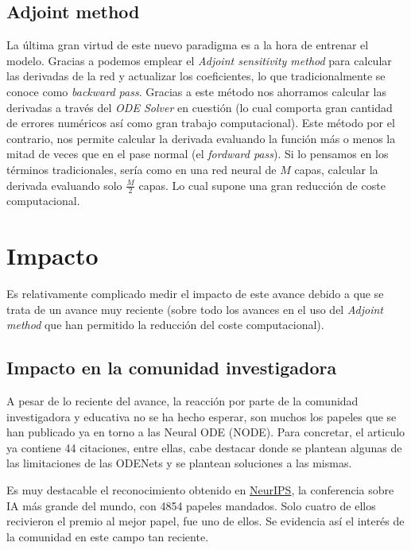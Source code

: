 \documentclass[12pt]{report}
\begin{document}
\section{Adjoint method}
La última gran virtud de este nuevo paradigma es a la hora de entrenar el
modelo. Gracias a \cite{node} podemos emplear el \textit{Adjoint sensitivity
method} para calcular las derivadas de la red y actualizar los coeficientes, lo
que tradicionalmente se conoce
como \textit{backward pass}. Gracias a este método nos ahorramos calcular las
derivadas a través del \textit{ODE Solver} en cuestión (lo cual comporta gran
cantidad de errores numéricos así como gran trabajo computacional). Este método
por el contrario, nos permite calcular la derivada evaluando la función más o
menos la mitad de veces que en el pase normal (el \textit{fordward pass}). Si lo
pensamos en los términos tradicionales, sería como en una red neural de $M$
capas, calcular la derivada evaluando solo $\frac{M}{2}$ capas. Lo cual supone
una gran reducción de coste computacional.

\chapter{Impacto}
Es relativamente complicado medir el impacto de este avance debido a que se
trata de un avance muy reciente (sobre todo los avances en el uso del
\textit{Adjoint method} que han permitido la reducción del coste computacional).

\section{Impacto en la comunidad investigadora}
A pesar de lo reciente del avance, la reacción por parte de la comunidad
investigadora y educativa no se ha hecho esperar, son muchos los papeles que se
han publicado ya en torno a las Neural ODE (NODE). Para concretar, el articulo
\cite{node} ya contiene 44 citaciones, entre ellas, cabe destacar \cite{anode}
donde se plantean algunas de las limitaciones de las ODENets y se plantean
soluciones a las mismas.

Es muy destacable el reconocimiento obtenido en
\href{https://nips.cc/}{NeurIPS}, la conferencia sobre IA más grande del mundo,
con 4854 papeles mandados. Solo cuatro de ellos recivieron el premio al mejor
papel, \cite{node} fue uno de ellos. Se evidencia así el interés de la comunidad
en este campo tan reciente.
\end{document}
